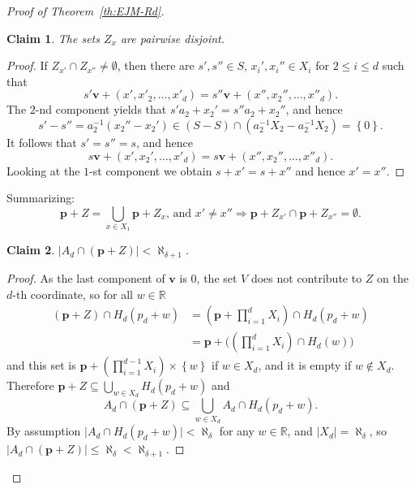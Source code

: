 \documentclass[12pt]{amsart}
\newcommand{\R}{\mathbb{R}}	%
\newcommand{\IMPLIES}{\Rightarrow }
\newcommand{\setLR}[1]{\left \{ {#1} \right \}} %
\newcommand{\card}[1]{\mathopen | #1 \mathclose |}		%
\theoremstyle{plain}
\newtheorem{claim}{Claim}[theorem]
\theoremstyle{definition}
\theoremstyle{remark}
\begin{document}
\begin{proof}[Proof of Theorem~\ref{th:EJM-Rd}]
\begin{claim}\label{cl:th:EJM-Rd-1}
The sets \( Z_x \) are pairwise disjoint.
\end{claim}

\begin{proof}
If \( Z_{x'} \cap Z_{x''} \neq \emptyset \), then there are \( s' , s'' \in S \), \( x_i' , x_i'' \in X_i \) for \( 2 \leq i \leq d \) such that 
\[
s' \mathbf{v} + ( x ' , x'_2 , \dots , x'_d ) = s'' \mathbf{v} + ( x '' , x_2 '' , \dots , x''_d ) .
\]
The \( 2 \)-nd component yields that \( s' a_2 + x_2' = s'' a_2 + x_2 '' \), and hence 
\[
s' - s'' = a_2^{-1} ( x_2 '' - x_2' ) \in ( S - S ) \cap ( a_2^{-1} X_2 - a_2^{-1} X_2 ) = \setLR{0} .
\]
It follows that \( s' = s'' = s \), and hence 
\[
s \mathbf{v} + ( x ' , x_2 ' , \dots , x'_d ) = s \mathbf{v} + ( x '' , x_2 '' , \dots , x''_d ) .
\]
Looking at the \( 1 \)-st component we obtain \( s + x ' = s + x '' \) and hence \( x ' = x '' \).
\end{proof}

Summarizing: 
\begin{equation}\label{eq:th:EJM-Rd-2}
 \mathbf{p} + Z = \bigcup_{ x \in X_1 } \mathbf{p} + Z_x \text{, and } x' \neq x'' \IMPLIES \mathbf{p} + Z_{x'} \cap \mathbf{p} + Z_{x''} = \emptyset .
\end{equation}

\begin{claim}\label{cl:th:EJM-Rd-2}
\( \card{ A_d \cap ( \mathbf{p} + Z ) } < \aleph_{ \delta + 1 } \).
\end{claim}

\begin{proof}
As the last component of \( \mathbf{v} \) is \( 0 \), the set \( V \) does not contribute to \( Z \) on the \( d \)-th coordinate, so for all \( w \in \R \)
\[ 
\begin{split}
( \mathbf{p} + Z ) \cap H_d ( p_d + w ) & = ( \mathbf{p} + \textstyle \prod_{ i = 1 }^d X_i ) \cap H_d ( p_d + w ) 
\\
 & = \mathbf{p} + \bigl ( ( \textstyle \prod_{ i = 1 }^d X_i ) \cap H_d ( w ) \bigr )
\end{split}
\]
and this set is \( \mathbf{p} + ( \prod_{i = 1 }^{ d - 1} X_i ) \times \setLR{ w } \) if \( w \in X_d \), and it is empty if \( w \notin X_d \).
Therefore \( \mathbf{p} + Z \subseteq \bigcup_{w \in X_d } H_d ( p_d + w ) \) and 
\[
A_d \cap ( \mathbf{p} + Z ) \subseteq \textstyle \bigcup_{ w \in X_d } A_d \cap H_d ( p_d + w ) .
\]
By assumption \( \card{ A_d \cap H_d ( p_d + w ) } < \aleph_{ \delta } \) for any \( w \in \R \), and \( \card{ X_d } = \aleph_ \delta \), so \( \card{ A_d \cap ( \mathbf{p} + Z ) } \leq \aleph_ \delta < \aleph_{ \delta + 1 } \).
\end{proof}


\end{proof}
\end{document}
